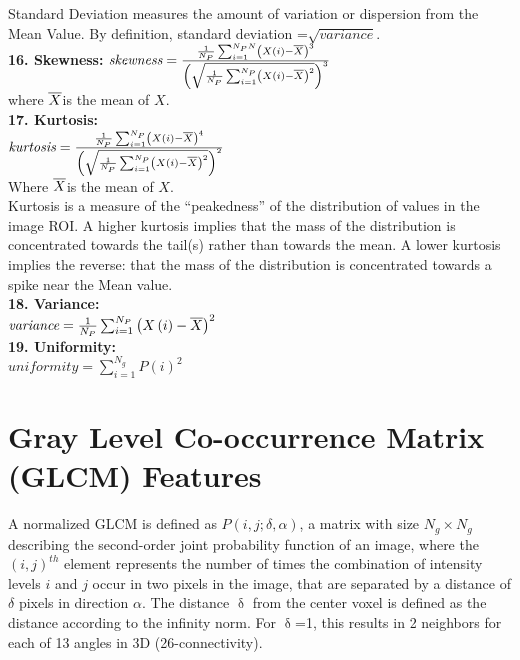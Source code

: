 {Standard Deviation measures the amount of variation or dispersion from the Mean Value. By definition, standard deviation =}$\sqrt{\textit{variance}}$.\\
{\textbf{16. Skewness:}}
$\textit{skewness}=\frac{\frac{1}{N_{P}}\sum _{i=1}^{N_{P}N}\left(X\left(i\right)-\overline{X}\right)^{3}}{\left(\sqrt{\frac{1}{N_{P}}\sum _{i=1}^{N_{P}}\left(X\left(i\right)-\overline{X}\right)^{2}}\right)^{3}}$\\
{where} $\overline{X}${is the mean of} $X$.\\
\textbf{17. Kurtosis:}\\
$\textit{kurtosis}=\frac{\frac{1}{N_{P}}\sum _{i=1}^{N_{P}}\left(X\left(i\right)-\overline{X}\right)^{4}}{\left(\sqrt{\frac{1}{N_{P}}\sum _{i=1}^{N_{P}}\left(X\left(i\right)-\overline{X}\right)^{2}}\right)^{2}}$\\
{Where} $\overline{X}${is the mean of} $X$.\\
{Kurtosis is a measure of the “peakedness” of the distribution of values in the image ROI. A higher kurtosis implies that the mass of the distribution is concentrated towards the tail(s) rather than towards the mean. A lower kurtosis implies the reverse: that the mass of the distribution is concentrated towards a spike near the Mean value.}\\
{\textbf{18. Variance:}}\\
$\textit{variance}=\frac{1}{N_{P}}\sum _{i=1}^{N_{P}}\left(X\left(i\right)-\overline{X}\right)^{2}$\\
\textbf{19. Uniformity:}\\
$\textit{uniformity}=\sum _{i=1}^{N_{g}}P\left(i\right)^{2}$



\section{Gray Level Co-occurrence Matrix (GLCM) Features}

A normalized GLCM is defined as $P\left(i,j;\delta ,\alpha \right)$, a matrix with size $N_{g}\times N_{g}$ describing the second-order joint probability function of an image, where the $\left(i,j\right)^{th}$ element represents the number of times the combination of intensity levels $i$ and $j$ occur in two pixels in the image, that are separated by a distance of $\delta $ pixels in direction $\alpha $. The distance $\updelta$ from the center voxel is defined as the distance according to the infinity norm. For $\updelta$=1, this results in 2 neighbors for each of 13 angles in 3D (26-connectivity).

